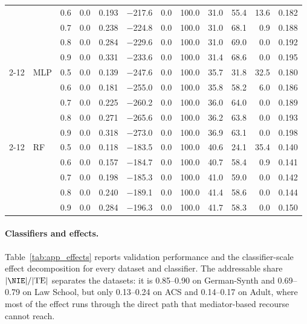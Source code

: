 \begin{table}[t]
\begin{tabular}{lllrrrrrrrrr}
 &  & 0.6 & 0.0 & 0.193 & $-$217.6 & 0.0 & 100.0 & 31.0 & 55.4 & 13.6 & 0.182 \\
 &  & 0.7 & 0.0 & 0.238 & $-$224.8 & 0.0 & 100.0 & 31.0 & 68.1 & 0.9 & 0.188 \\
 &  & 0.8 & 0.0 & 0.284 & $-$229.6 & 0.0 & 100.0 & 31.0 & 69.0 & 0.0 & 0.192 \\
 &  & 0.9 & 0.0 & 0.331 & $-$233.6 & 0.0 & 100.0 & 31.4 & 68.6 & 0.0 & 0.195 \\
\cline{2-12}
 & MLP & 0.5 & 0.0 & 0.139 & $-$247.6 & 0.0 & 100.0 & 35.7 & 31.8 & 32.5 & 0.180 \\
 &  & 0.6 & 0.0 & 0.181 & $-$255.0 & 0.0 & 100.0 & 35.8 & 58.2 & 6.0 & 0.186 \\
 &  & 0.7 & 0.0 & 0.225 & $-$260.2 & 0.0 & 100.0 & 36.0 & 64.0 & 0.0 & 0.189 \\
 &  & 0.8 & 0.0 & 0.271 & $-$265.6 & 0.0 & 100.0 & 36.2 & 63.8 & 0.0 & 0.193 \\
 &  & 0.9 & 0.0 & 0.318 & $-$273.0 & 0.0 & 100.0 & 36.9 & 63.1 & 0.0 & 0.198 \\
\cline{2-12}
 & RF & 0.5 & 0.0 & 0.118 & $-$183.5 & 0.0 & 100.0 & 40.6 & 24.1 & 35.4 & 0.140 \\
 &  & 0.6 & 0.0 & 0.157 & $-$184.7 & 0.0 & 100.0 & 40.7 & 58.4 & 0.9 & 0.141 \\
 &  & 0.7 & 0.0 & 0.198 & $-$185.3 & 0.0 & 100.0 & 41.0 & 59.0 & 0.0 & 0.142 \\
 &  & 0.8 & 0.0 & 0.240 & $-$189.1 & 0.0 & 100.0 & 41.4 & 58.6 & 0.0 & 0.144 \\
 &  & 0.9 & 0.0 & 0.284 & $-$196.3 & 0.0 & 100.0 & 41.7 & 58.3 & 0.0 & 0.150 \\
\hline
\end{tabular}
\end{table}

\paragraph{Classifiers and effects.}
Table~\ref{tab:app_effects} reports validation performance and the
classifier-scale effect decomposition for every dataset and classifier. The
addressable share $|\NIE|/|\mathrm{TE}|$ separates the datasets: it is
0.85--0.90 on German-Synth and 0.69--0.79 on Law School, but only 0.13--0.24
on ACS and 0.14--0.17 on Adult, where most of the effect runs through the
direct path that mediator-based recourse cannot reach.

